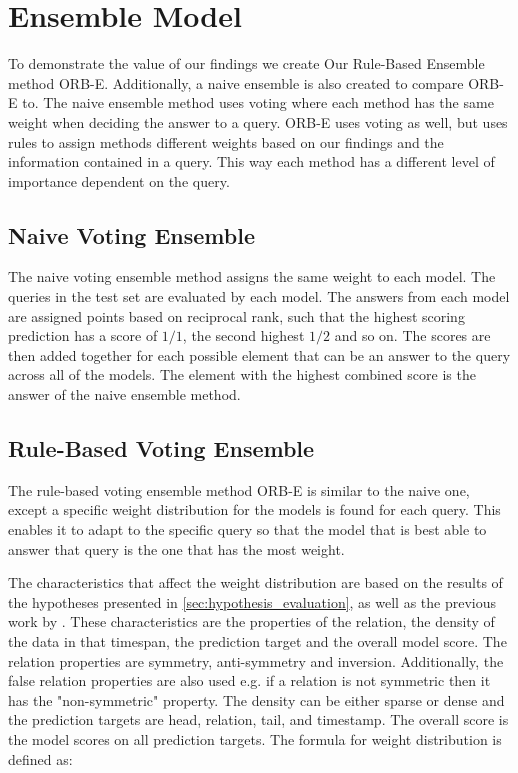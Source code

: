 \section{Ensemble Model}
\label{sec:ensemble_model}
To demonstrate the value of our findings we create Our Rule-Based Ensemble method ORB-E. Additionally, a naive ensemble is also created to compare ORB-E to.
The naive ensemble method uses voting\cite{MOHAMMED2023757} where each method has the same weight when deciding the answer to a query. ORB-E uses voting as well, but uses rules to assign methods different weights based on our findings and the information contained in a query. This way each method has a different level of importance dependent on the query.

\subsection{Naive Voting Ensemble}
The naive voting ensemble method assigns the same weight to each model. The queries in the test set are evaluated by each model. The answers from each model are assigned points based on reciprocal rank, such that the highest scoring prediction has a score of \(1/1\), the second highest \(1/2\) and so on. The scores are then added together for each possible element that can be an answer to the query across all of the models. The element with the highest combined score is the answer of the naive ensemble method.

\subsection{Rule-Based Voting Ensemble}
The rule-based voting ensemble method ORB-E is similar to the naive one, except a specific weight distribution for the models is found for each query. This enables it to adapt to the specific query so that the model that is best able to answer that query is the one that has the most weight.

The characteristics that affect the weight distribution are based on the results of the hypotheses presented in \autoref{sec:hypothesis_evaluation}, as well as the previous work by \cite{P9}. 
These characteristics are the properties of the relation, the density of the data in that timespan, the prediction target and the overall model score.
The relation properties are symmetry, anti-symmetry and inversion. 
Additionally, the false relation properties are also used e.g. if a relation is not symmetric then it has the "non-symmetric" property. 
The density can be either sparse or dense and the prediction targets are head, relation, tail, and timestamp.
The overall score is the model scores on all prediction targets.
The formula for weight distribution is defined as:

